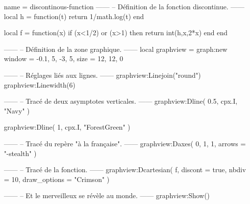 \documentclass[border = 3pt]{standalone}
\begin{document}
\begin{luadraw}{name = discontinous-function}
------
-- Définition de la fonction discontinue.
------
local h = function(t)
  return 1/math.log(t)
end

local f = function(x)
  if (x<1/2) or (x>1) then
    return int(h,x,2*x)
  end
end

------
-- Définition de la zone graphique.
------
local graphview = graph:new{
  window = {-0.1, 5, -3, 5},
  size   = {12, 12, 0}
}

------
-- Réglages liés aux lignes.
------
graphview:Linejoin("round")
graphview:Linewidth(6)

------
-- Tracé de deux asymptotes verticales.
------
graphview:Dline(
  {0.5, cpx.I},
  "Navy"
)

graphview:Dline(
  {1, cpx.I},
  "ForestGreen"
)

------
-- Tracé du repère "à la française".
------
graphview:Daxes(
  {0, 1, 1},
  {
    arrows = "-stealth"
  })

------
-- Tracé de la fonction.
------
graphview:Dcartesian(
  f,
  {
    discont      = true,
    nbdiv        = 10,
    draw_options = "Crimson"
  })

------
-- Et le merveilleux se révèle au monde.
------
graphview:Show()
\end{luadraw}
\end{document}
